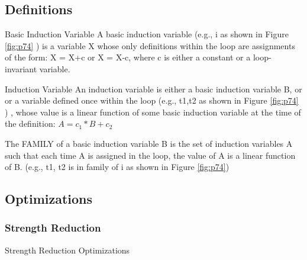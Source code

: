 \subsection{Definitions}

\begin{definition}{Basic Induction Variable}
    A basic induction variable (e.g., i as shown in Figure \ref{fig:p74} ) is a variable X whose only definitions within the loop
are assignments of the form: X = X+c or X = X-c, where c is either a constant or 
a loop-invariant variable. 
\end{definition}

\begin{definition}{Induction Variable}
    An induction variable is either a basic induction variable B, or
or a variable defined once within the loop (e.g., t1,t2 as shown in Figure \ref{fig:p74} ) , whose value is a linear function
of some basic induction variable at the time of the definition:
$A = c_1 * B + c_2$
\end{definition}

The FAMILY of a basic induction variable B is the set of induction variables A such that each time A is assigned in the loop,
the value of A is a linear function of B. (e.g., t1, t2 is in family of i as shown in Figure \ref{fig:p74})


\subsection{Optimizations}

\subsubsection{Strength Reduction}
\begin{algorithm}[H]
    \caption{Strength Reduction Optimizations}\label{alg:Strength Reduction Optimizations}
    \begin{algorithmic}


    \end{algorithmic}
    \end{algorithm}

